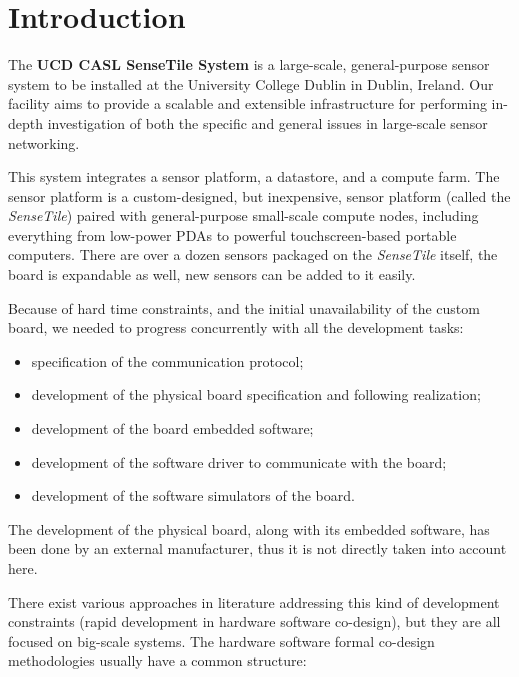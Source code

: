 \documentclass{article} \usepackage{times}
\newcommand{\ST}{\emph{SenseTile}\xspace}
\begin{document}
\section{Introduction}
\label{sec:introduction}

The \textbf{UCD CASL SenseTile System} is a large-scale,
general-purpose sensor system to be installed at the University
College Dublin in Dublin, Ireland.  Our facility aims to provide a
scalable and extensible infrastructure for performing in-depth
investigation of both the specific and general issues in large-scale
sensor networking.

This system integrates a sensor platform, a datastore, and a compute
farm.  The sensor platform is a custom-designed, but inexpensive,
sensor platform (called the \ST) paired with general-purpose
small-scale compute nodes, including everything from low-power PDAs to
powerful touchscreen-based portable computers.  There are over a dozen
sensors packaged on the \ST itself, the board is expandable as well,
new sensors can be added to it easily.

Because of hard time constraints, and the initial unavailability of
the custom board, we needed to progress concurrently with all the
development tasks:

\begin{itemize}
\item specification of the communication protocol;
\item development of the physical board specification and following
  realization;
\item development of the board embedded software;
\item development of the software driver to communicate with the
  board;
\item development of the software simulators of the board.
\end{itemize}

The development of the physical board, along with its embedded
software, has been done by an external manufacturer, thus it is not
directly taken into account here.

There exist various approaches in literature addressing this kind of
development constraints (rapid development in hardware software
co-design), but they are all focused on big-scale systems.  The
hardware software formal co-design methodologies usually have a common
structure\cite{Slomka2000,Hoffman2001}:
\end{document}
